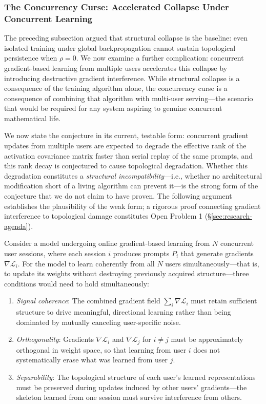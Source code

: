 \documentclass{article}
\begin{document}
\subsubsection{The Concurrency Curse: Accelerated Collapse Under Concurrent Learning}

\noindent The preceding subsection argued that structural collapse is the baseline: even isolated training under global backpropagation cannot sustain topological persistence when $\rho = 0$. We now examine a further complication: concurrent gradient-based learning from multiple users accelerates this collapse by introducing destructive gradient interference. While structural collapse is a consequence of the training algorithm alone, the concurrency curse is a consequence of combining that algorithm with multi-user serving---the scenario that would be required for any system aspiring to genuine concurrent mathematical life.

We now state the conjecture in its current, testable form: concurrent gradient updates from multiple users are expected to degrade the effective rank of the activation covariance matrix faster than serial replay of the same prompts, and this rank decay is conjectured to cause topological degradation. Whether this degradation constitutes a \emph{structural incompatibility}---i.e., whether no architectural modification short of a living algorithm can prevent it---is the strong form of the conjecture that we do not claim to have proven. The following argument establishes the plausibility of the weak form; a rigorous proof connecting gradient interference to topological damage constitutes Open Problem 1 (\S\ref{sec:research-agenda}).

Consider a model undergoing online gradient-based learning from $N$ concurrent user sessions, where each session $i$ produces prompts $P_i$ that generate gradients $\nabla \mathcal{L}_i$. For the model to learn coherently from all $N$ users simultaneously---that is, to update its weights without destroying previously acquired structure---three conditions would need to hold simultaneously:

\begin{enumerate}
    \item \emph{Signal coherence}: The combined gradient field $\sum_i \nabla \mathcal{L}_i$ must retain sufficient structure to drive meaningful, directional learning rather than being dominated by mutually canceling user-specific noise.
    \item \emph{Orthogonality}: Gradients $\nabla \mathcal{L}_i$ and $\nabla \mathcal{L}_j$ for $i \neq j$ must be approximately orthogonal in weight space, so that learning from user $i$ does not systematically erase what was learned from user $j$.
    \item \emph{Separability}: The topological structure of each user's learned representations must be preserved during updates induced by other users' gradients---the skeleton learned from one session must survive interference from others.
\end{enumerate}
\end{document}
